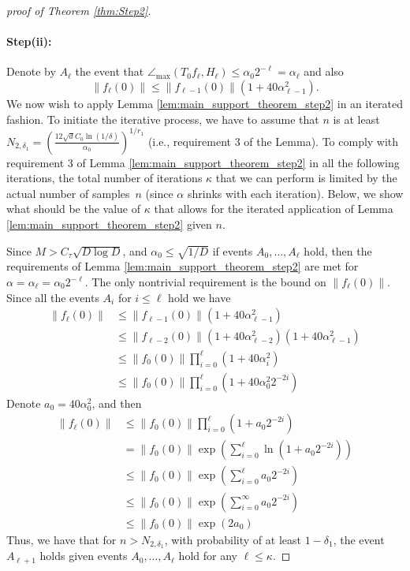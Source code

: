 \documentclass[12pt]{article}
\theoremstyle{remark}
\newcommand{\maxangle}{\angle_{\max}}
\newcommand{\stau}{\tau}
\begin{document}
\begin{proof}[proof of Theorem \ref{thm:Step2}]
	
	\paragraph*{Step(ii):}
	Denote by $A_\ell$ the event that $\maxangle (T_0f_{\ell}, H_{\ell}) \leq \alpha_0 2^{-\ell} = \alpha_{\ell}$ and also
	\[
	\|f_\ell(0)\| \leq \|f_{\ell-1}(0)\|\left(1+40\alpha_{\ell-1}^2\right)
	.\]
	We now wish to apply Lemma \ref{lem:main_support_theorem_step2} in an iterated fashion.
	To initiate the iterative process, we have to assume that $n$ is at least $N_{2, \delta_1} = \left( \frac{12\sqrt{d}C_0\ln(1/\delta)}{\alpha_0}\right)^{1/r_1}$ (i.e., requirement 3 of the Lemma).
	To comply with requirement 3 of Lemma \ref{lem:main_support_theorem_step2} in all the following iterations, the total number of iterations $ \kappa$ that we can perform is limited by the actual number of samples~$n$ (since  $\alpha$ shrinks with each iteration).
	Below, we show what should be the value of $\kappa$ that allows for the iterated application of Lemma \ref{lem:main_support_theorem_step2} given $n$.
	
	Since $M>C_\stau \sqrt{D\log D}$, and $\alpha_0 \leq \sqrt{ 1/D}$ if events $A_0, \ldots, A_\ell$ hold, then the requirements of Lemma \ref{lem:main_support_theorem_step2} are met for $\alpha = \alpha_\ell = \alpha_0 2^{-\ell}$. 
	The only nontrivial requirement is the bound on $\|f_\ell(0)\|$. Since all the events $A_{i}$ for $i\leq \ell$ hold we have
	\begin{align*}
		\|f_\ell(0)\| &\leq \|f_{\ell-1}(0)\|\left(1+40\alpha_{\ell-1}^2  \right) \nonumber
		\\
		&\leq \|f_{\ell-2}(0)\|\left(1+40\alpha_{\ell-2}^2 \right)\left(1+40\alpha_{\ell-1}^2  \right) \nonumber
		\\
		&\leq \|f_{0}(0)\|\prod_{i=0}^{\ell} \left(1+40\alpha_{i}^2  \right)
		\\
		&\leq \|f_{0}(0)\|\prod_{i=0}^{\ell} \left(1+40\alpha_0^2 2^{-2i} \right)
	\end{align*}
	Denote $a_0 = 40\alpha_0 ^2$, and then
	\begin{align*}
		\|f_\ell(0)\| &\leq \|f_{0}(0)\|\prod_{i=0}^{\ell} \left(1+a_0 2^{-2i} \right)
		\\
		& = \|f_{0}(0)\|\exp\left(\sum_{i=0}^{\ell} \ln\left(1+a_0 2^{-2i} \right)\right)
		\\
		& \leq \|f_{0}(0)\|\exp\left(\sum_{i=0}^{\ell} a_0 2^{-2i} \right)
		\\
		& \leq \|f_{0}(0)\|\exp\left(\sum_{i=0}^{\infty} a_0 2^{-2i} \right)
		\\
		& \leq \|f_{0}(0)\|\exp\left(2a_0  \right)
	\end{align*}
	Thus, we have that for $n> N_{2,\delta_1}$, with probability of at least $1-\delta_1$, the event $A_{\ell+1}$ holds given events $A_0, \ldots, A_{\ell}$ hold for any $\ell \leq \kappa$.
	

\end{proof}
\end{document}
